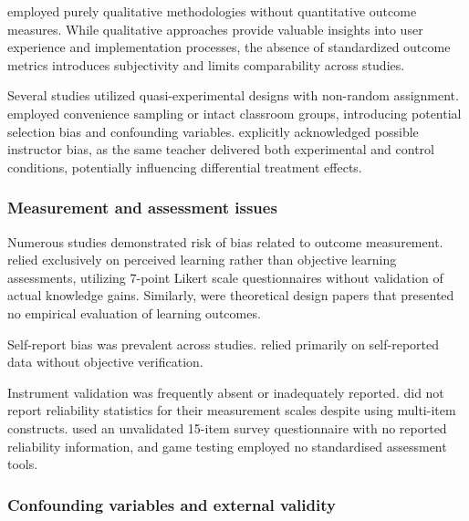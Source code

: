 \documentclass[a4paper,fleqn]{cas-sc}
\begin{document}
\citet{3Watson2011466, 12Gilbert2019108, 14Forsyth2023, 46Stirling2022, 60Hoy2018, 65Razak201139, 71lynch2015pedagogical} employed purely qualitative methodologies without quantitative outcome measures. While qualitative approaches provide valuable insights into user experience and implementation processes, the absence of standardized outcome metrics introduces subjectivity and limits comparability across studies.

Several studies utilized quasi-experimental designs with non-random assignment. \citet{11Ternblad2023115, 28Chao201734, 41Petersen2023301, 72hutauruk2020utilization} employed convenience sampling or intact classroom groups, introducing potential selection bias and confounding variables. \citet{8Yu2014} explicitly acknowledged possible instructor bias, as the same teacher delivered both experimental and control conditions, potentially influencing differential treatment effects.

\subsubsection{Measurement and assessment issues}

Numerous studies demonstrated risk of bias related to outcome measurement. \citet{5kazanidis2018alpha} relied exclusively on perceived learning rather than objective learning assessments, utilizing 7-point Likert scale questionnaires without validation of actual knowledge gains. Similarly, \citet{10Huaman2019220, 17Manzanares2019, 18Shih201054, 20Erandaru2014, 23Zin2009322} were theoretical design papers that presented no empirical evaluation of learning outcomes.

Self-report bias was prevalent across studies. \citet{9Lin2018, 15Slater2022, 35Fernandez2023, 43ali2018indonesian, 46Stirling2022, 58Shih2015173, 69Wong2017150, 75trajano2014using} relied primarily on self-reported data without objective verification.

Instrument validation was frequently absent or inadequately reported. \citet{11Ternblad2023115} did not report reliability statistics for their measurement scales despite using multi-item constructs. \citet{43ali2018indonesian} used an unvalidated 15-item survey questionnaire with no reported reliability information, and game testing employed no standardised assessment tools.

\subsubsection{Confounding variables and external validity}
\end{document}
